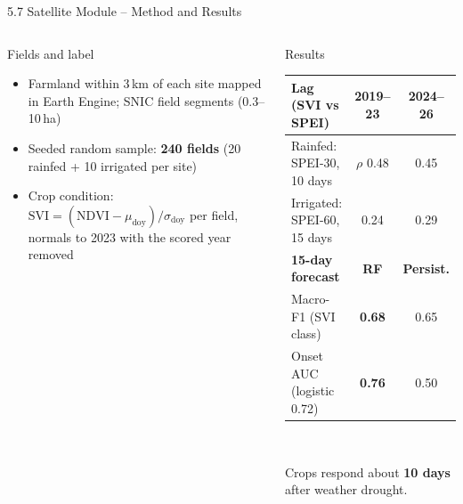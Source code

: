 \documentclass[aspectratio=169,10pt]{beamer}
\begin{document}
\begin{frame}{5.7 Satellite Module -- Method and Results}
\vspace{1mm}
\begin{columns}[T,onlytextwidth]
\begin{card}[equal height group=sat]{Fields and label}
\small
\begin{itemize}
\item Farmland within 3\,km of each site mapped in Earth Engine; SNIC field segments (0.3--10\,ha)
\item Seeded random sample: \textbf{240 fields} (20 rainfed + 10 irrigated per site)
\item Crop condition: $\mathrm{SVI} = (\mathrm{NDVI} - \mu_{\mathrm{doy}}) / \sigma_{\mathrm{doy}}$ per field, normals to 2023 with the scored year removed
\end{itemize}
\end{card}
\begin{keycard}[equal height group=sat]{Results}
\small
\renewcommand{\arraystretch}{1.2}
\begin{tabularx}{\linewidth}{@{}Ycc@{}}
\toprule
\textbf{Lag (SVI vs SPEI)} & \textbf{2019--23} & \textbf{2024--26} \\ \midrule
Rainfed: SPEI-30, 10 days & $\rho$ 0.48 & 0.45 \\
Irrigated: SPEI-60, 15 days & 0.24 & 0.29 \\ \midrule
\textbf{15-day forecast} & \textbf{RF} & \textbf{Persist.} \\ \midrule
Macro-F1 (SVI class) & \textbf{0.68} & 0.65 \\
Onset AUC (logistic 0.72) & \textbf{0.76} & 0.50 \\
\bottomrule
\end{tabularx}\\[4pt]
{\raggedright Crops respond about \textbf{10 days} after weather drought.\par}
\end{keycard}
\end{columns}
\end{frame}
\end{document}
